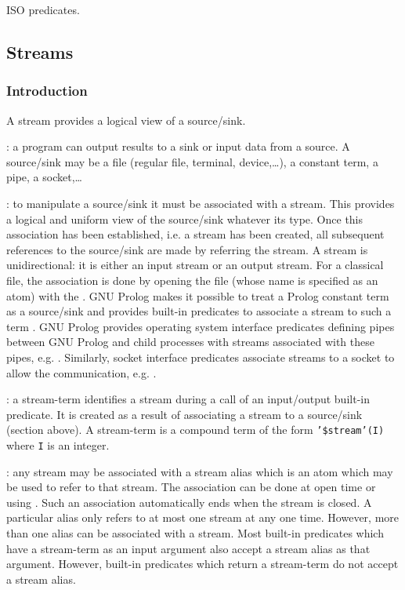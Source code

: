 \Portability

ISO predicates.

\subsection{Streams}
\label{Streams}

\subsubsection{Introduction}
\label{Introduction:(Streams)}
A stream provides a logical view of a source/sink.

: a program can output results to a sink or input
data from a source. A source/sink may be a file (regular file, terminal,
device,\ldots), a constant term, a pipe, a socket,\ldots

: to manipulate a source/sink
it must be associated with a stream. This provides a logical and uniform view
of the source/sink whatever its type. Once this association has been
established, i.e. a stream has been created, all subsequent references to
the source/sink are made by referring the stream. A stream is
unidirectional: it is either an input stream or an output stream. For a
classical file, the association is done by opening the file (whose name is
specified as an atom) with the  . GNU Prolog
makes it possible to treat a Prolog constant term as a source/sink and
provides built-in predicates to associate a stream to such a term
. GNU Prolog provides operating system interface
predicates defining pipes between GNU Prolog and child processes with streams
associated with these pipes, e.g.  .
Similarly, socket interface predicates associate streams to a socket to
allow the communication, e.g. 
.

: a stream-term identifies a stream during a call of an
input/output built-in predicate. It is created as a result of associating a
stream to a source/sink (section above). A stream-term is a compound term of
the form \texttt{'\$stream'(I)} where \texttt{I} is an integer.

: any stream may be associated with a stream alias
which is an atom which may be used to refer to that stream. The association
can be done at open time or using 
. Such an association automatically ends when the
stream is closed. A particular alias only refers to at most one stream at any
one time. However, more than one alias can be associated with a stream. Most
built-in predicates which have a stream-term as an input argument also accept
a stream alias as that argument. However, built-in predicates which return a
stream-term do not accept a stream alias.

